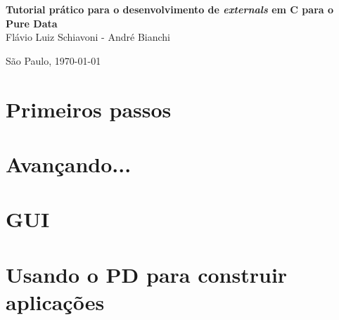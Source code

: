 \documentclass[10pt,a4paper]{report}
\newcommand{\externals}{\emph{externals}\xspace}
\begin{document}
\thispagestyle{empty}
\begin{center}
    \vspace*{2.3cm}
    \vskip 8cm
    \textbf{\Large{Tutorial prático para o desenvolvimento de \externals em C para o
Pure Data}}\\

    \vspace*{1.2cm}
    \vskip 5cm
    \Large{Flávio Luiz Schiavoni - André Bianchi}

    \vskip 5cm

    \vskip 0.5cm
    \normalsize{São Paulo, \today}
\end{center}

\tableofcontents

\part{Primeiros passos}






\part{Avançando...}



\part{GUI}



\part{Usando o PD para construir aplicações}

\end{document}
